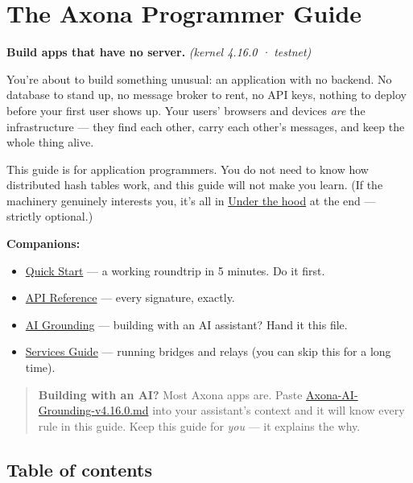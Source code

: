 \documentclass[
  nobib]{tufte-handout}
\author{}
\date{}
\providecommand{\tightlist}{%
  \setlength{\itemsep}{0pt}\setlength{\parskip}{0pt}}
\begin{document}
\section{The Axona Programmer Guide}\label{the-axona-programmer-guide}

\textbf{Build apps that have no server.} \emph{(kernel 4.16.0 ·
testnet)}

You're about to build something unusual: an application with no backend.
No database to stand up, no message broker to rent, no API keys, nothing
to deploy before your first user shows up. Your users' browsers and
devices \emph{are} the infrastructure --- they find each other, carry
each other's messages, and keep the whole thing alive.

This guide is for application programmers. You do not need to know how
distributed hash tables work, and this guide will not make you learn.
(If the machinery genuinely interests you, it's all in
\hyperref[9-under-the-hood--optional]{Under the hood} at the end ---
strictly optional.)

\textbf{Companions:}

\begin{itemize}
\tightlist
\item
  \href{Quick-Start-v4.16.0.md}{Quick Start} --- a working roundtrip in
  5 minutes. Do it first.
\item
  \href{Axona-API-Reference-v4.16.0.md}{API Reference} --- every
  signature, exactly.
\item
  \href{Axona-AI-Grounding-v4.16.0.md}{AI Grounding} --- building with
  an AI assistant? Hand it this file.
\item
  \href{Axona-Services-Guide-v4.16.0.md}{Services Guide} --- running
  bridges and relays (you can skip this for a long time).
\end{itemize}

\begin{quote}
\textbf{Building with an AI?} Most Axona apps are. Paste
\url{Axona-AI-Grounding-v4.16.0.md} into your assistant's context and it
will know every rule in this guide. Keep this guide for \emph{you} ---
it explains the why.
\end{quote}

\subsection{Table of contents}\label{table-of-contents}
\end{document}
